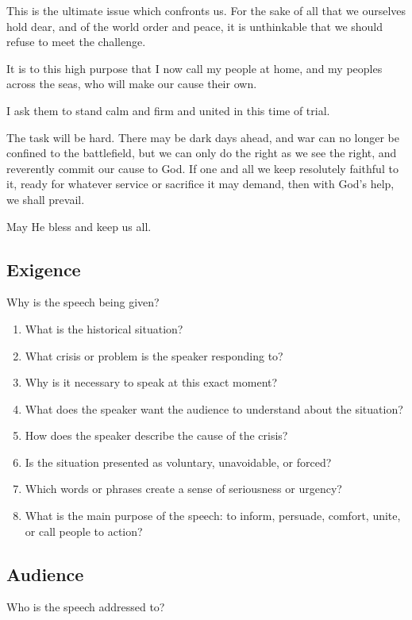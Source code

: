 \documentclass[10pt,a4paper,table]{article}
\begin{document}
This is the ultimate issue which confronts us. For the sake of all that we ourselves hold dear, and of the world order and peace, it is unthinkable that we should refuse to meet the challenge.

It is to this high purpose that I now call my people at home, and my peoples across the seas, who will make our cause their own.

I ask them to stand calm and firm and united in this time of trial.

The task will be hard. There may be dark days ahead, and war can no longer be confined to the battlefield, but we can only do the right as we see the right, and reverently commit our cause to God. If one and all we keep resolutely faithful to it, ready for whatever service or sacrifice it may demand, then with God's help, we shall prevail.

May He bless and keep us all.
\nolinenumbers

\clearpage

\subsection{Exigence}
Why is the speech being given?

\begin{enumerate}[label=\arabic*., leftmargin=*]
  \item What is the historical situation?
  \item What crisis or problem is the speaker responding to?
  \item Why is it necessary to speak at this exact moment?
  \item What does the speaker want the audience to understand about the situation?
  \item How does the speaker describe the cause of the crisis?
  \item Is the situation presented as voluntary, unavoidable, or forced?
  \item Which words or phrases create a sense of seriousness or urgency?
  \item What is the main purpose of the speech: to inform, persuade, comfort, unite, or call people to action?
\end{enumerate}

\subsection{Audience}
Who is the speech addressed to?
\end{document}
